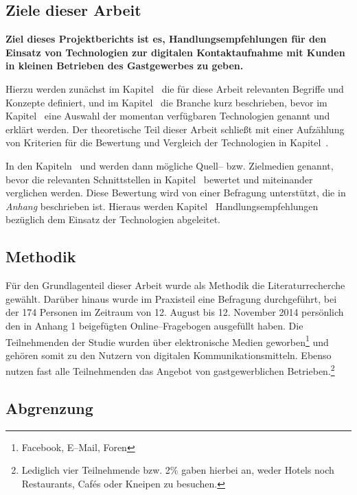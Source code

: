 \subsection{Ziele dieser Arbeit} %

\textbf{Ziel dieses Projektberichts ist es, Handlungsempfehlungen für den Einsatz von Technologien zur digitalen Kontaktaufnahme mit Kunden in kleinen Betrieben des Gastgewerbes zu geben.}

Hierzu werden zunächst im Kapitel~ die für diese Arbeit relevanten Begriffe und Konzepte definiert, und im Kapitel~ die Branche kurz beschrieben, bevor im Kapitel~ eine Auswahl der momentan verfügbaren Technologien genannt und erklärt werden.
Der theoretische Teil dieser Arbeit schließt mit einer Aufzählung von Kriterien für die Bewertung und Vergleich der Technologien in Kapitel~.

In den Kapiteln~ und  werden dann mögliche Quell– bzw. Zielmedien genannt, bevor  die relevanten Schnittstellen in Kapitel~ bewertet und miteinander verglichen werden. Diese Bewertung wird von einer Befragung unterstützt, die in \textit{Anhang} beschrieben ist. Hieraus werden Kapitel~ Handlungsempfehlungen bezüglich dem Einsatz der Technologien abgeleitet.

\subsection{Methodik} %
\label{sub:methodik}
Für den Grundlagenteil dieser Arbeit wurde als Methodik die Literaturrecherche gewählt. Darüber hinaus wurde im Praxisteil eine Befragung durchgeführt, bei der 174 Personen im Zeitraum von 12. August bis 12. November 2014 persönlich den in Anhang 1 beigefügten Online–Fragebogen ausgefüllt haben. Die Teilnehmenden der Studie wurden über elektronische Medien geworben\footnote{Facebook, E–Mail, Foren} und gehören somit zu den Nutzern von digitalen Kommunikationsmitteln. Ebenso nutzen fast alle Teilnehmenden das Angebot von gastgewerblichen Betrieben.\footnote{Lediglich vier Teilnehmende bzw. 2\% gaben hierbei an, weder Hotels noch Restaurants, Cafés oder Kneipen zu besuchen.}

\subsection{Abgrenzung} %


